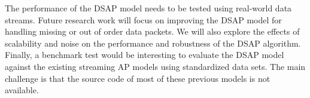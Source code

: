 The performance of the DSAP model needs to be tested using real-world data streams. Future research work will focus on improving the DSAP model for handling missing or out of order data packets. We will also explore the effects of scalability and noise on the performance and robustness of the DSAP algorithm. Finally, a benchmark test would be interesting to evaluate the DSAP model against the existing streaming AP models using standardized data sets. The main challenge is that the source code of most of these previous models is not available. 








